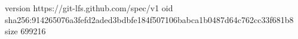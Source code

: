 version https://git-lfs.github.com/spec/v1
oid sha256:914265076a3fefd2aded3bdbfe184f507106babca1b0487d64c762cc33f681b8
size 699216
